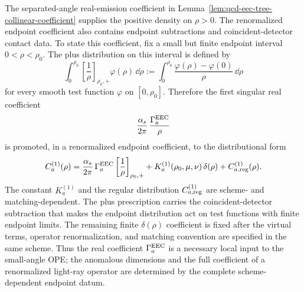The separated-angle real-emission coefficient in
Lemma~\ref{lem:qcd-eec-tree-collinear-coefficient} supplies the positive
density on \(\rho>0\).  The renormalized endpoint coefficient also contains
endpoint subtractions and coincident-detector contact data.  To state this
coefficient, fix a small but finite endpoint interval
\(0<\rho<\rho_0\).  The plus distribution on this interval is defined by
\begin{equation}
  \int_0^{\rho_0}
  \left[\frac1\rho\right]_{\rho_0,+}\varphi(\rho)\,\dd\rho
  :=
  \int_0^{\rho_0}
  \frac{\varphi(\rho)-\varphi(0)}{\rho}\,\dd\rho
  \label{eq:qcd-eec-rho-plus-definition}
\end{equation}
for every smooth test function \(\varphi\) on \([0,\rho_0]\).  Therefore the
first singular real coefficient
\[
  \frac{\alpha_s}{2\pi}\,
  \frac{\Gamma_a^{\rm EEC}}{\rho}
\]
is promoted, in a renormalized endpoint coefficient, to the distributional
form
\begin{equation}
  C_a^{(1)}(\rho)
  =
  \frac{\alpha_s}{2\pi}\,
  \Gamma_a^{\rm EEC}
  \left[\frac1\rho\right]_{\rho_0,+}
  +
  K_a^{(1)}(\rho_0,\mu,\nu)\,\delta(\rho)
  +
  C_{a,{\rm reg}}^{(1)}(\rho).
  \label{eq:qcd-eec-renormalized-endpoint-coefficient}
\end{equation}
The constant \(K_a^{(1)}\) and the regular distribution
\(C_{a,{\rm reg}}^{(1)}\) are scheme- and matching-dependent.  The plus
prescription carries the coincident-detector subtraction that makes the
endpoint distribution act on test functions with finite endpoint limits.  The
remaining finite \(\delta(\rho)\) coefficient is fixed after the virtual
terms, operator renormalization, and matching convention are specified in the
same scheme.  Thus the real coefficient \(\Gamma_a^{\rm EEC}\) is a
necessary local input to the small-angle OPE; the anomalous dimensions and
the full coefficient of a renormalized light-ray operator are determined by
the complete scheme-dependent endpoint datum.

